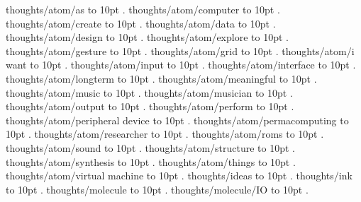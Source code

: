\smallskip
thoughts/atom/as \leaders\hbox to 10pt {\hss.\hss}  \hfill {}
\smallskip
thoughts/atom/computer \leaders\hbox to 10pt {\hss.\hss}  \hfill {}
\smallskip
thoughts/atom/create \leaders\hbox to 10pt {\hss.\hss}  \hfill {}
\smallskip
thoughts/atom/data \leaders\hbox to 10pt {\hss.\hss}  \hfill {}
\smallskip
thoughts/atom/design \leaders\hbox to 10pt {\hss.\hss}  \hfill {}
\smallskip
thoughts/atom/explore \leaders\hbox to 10pt {\hss.\hss}  \hfill {}
\smallskip
thoughts/atom/gesture \leaders\hbox to 10pt {\hss.\hss}  \hfill {}
\smallskip
thoughts/atom/grid \leaders\hbox to 10pt {\hss.\hss}  \hfill {}
\smallskip
thoughts/atom/i want \leaders\hbox to 10pt {\hss.\hss}  \hfill {}
\smallskip
thoughts/atom/input \leaders\hbox to 10pt {\hss.\hss}  \hfill {}
\smallskip
thoughts/atom/interface \leaders\hbox to 10pt {\hss.\hss}  \hfill {}
\smallskip
thoughts/atom/longterm \leaders\hbox to 10pt {\hss.\hss}  \hfill {}
\smallskip
thoughts/atom/meaningful \leaders\hbox to 10pt {\hss.\hss}  \hfill {}
\smallskip
thoughts/atom/music \leaders\hbox to 10pt {\hss.\hss}  \hfill {}
\smallskip
thoughts/atom/musician \leaders\hbox to 10pt {\hss.\hss}  \hfill {}
\smallskip
thoughts/atom/output \leaders\hbox to 10pt {\hss.\hss}  \hfill {}
\smallskip
thoughts/atom/perform \leaders\hbox to 10pt {\hss.\hss}  \hfill {}
\smallskip
thoughts/atom/peripheral device \leaders\hbox to 10pt {\hss.\hss}  \hfill {}
\smallskip
thoughts/atom/permacomputing \leaders\hbox to 10pt {\hss.\hss}  \hfill {}
\smallskip
thoughts/atom/researcher \leaders\hbox to 10pt {\hss.\hss}  \hfill {}
\smallskip
thoughts/atom/roms \leaders\hbox to 10pt {\hss.\hss}  \hfill {}
\smallskip
thoughts/atom/sound \leaders\hbox to 10pt {\hss.\hss}  \hfill {}
\smallskip
thoughts/atom/structure \leaders\hbox to 10pt {\hss.\hss}  \hfill {}
\smallskip
thoughts/atom/synthesis \leaders\hbox to 10pt {\hss.\hss}  \hfill {}
\smallskip
thoughts/atom/things \leaders\hbox to 10pt {\hss.\hss}  \hfill {}
\smallskip
thoughts/atom/virtual machine \leaders\hbox to 10pt {\hss.\hss}  \hfill {}
\smallskip
thoughts/ideas \leaders\hbox to 10pt {\hss.\hss}  \hfill {}
\smallskip
thoughts/ink \leaders\hbox to 10pt {\hss.\hss}  \hfill {}
\smallskip
thoughts/molecule \leaders\hbox to 10pt {\hss.\hss}  \hfill {}
\smallskip
thoughts/molecule/IO \leaders\hbox to 10pt {\hss.\hss}  \hfill {}
